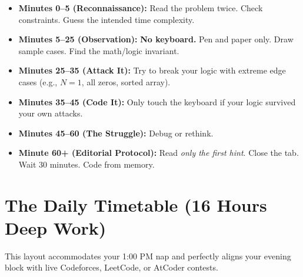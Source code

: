 \documentclass[12pt, a4paper]{article}
\begin{document}
\begin{sidebar}
\begin{itemize}[leftmargin=1.5em, itemsep=6pt]

  \item \textbf{Minutes 0--5 (Reconnaissance):} Read the problem twice. Check
        constraints. Guess the intended time complexity.

  \item \textbf{Minutes 5--25 (Observation):} \textbf{No keyboard.} Pen and
        paper only. Draw sample cases. Find the math/logic invariant.

  \item \textbf{Minutes 25--35 (Attack It):} Try to break your logic with
        extreme edge cases (e.g., $N = 1$, all zeros, sorted array).

  \item \textbf{Minutes 35--45 (Code It):} Only touch the keyboard if your
        logic survived your own attacks.

  \item \textbf{Minutes 45--60 (The Struggle):} Debug or rethink.

  \item \textbf{Minute 60+ (Editorial Protocol):} Read \emph{only the first
        hint}. Close the tab. Wait 30 minutes. Code from memory.

\end{itemize}
\end{sidebar}

\section{The Daily Timetable (16 Hours Deep Work)}

This layout accommodates your 1:00 PM nap and perfectly aligns your evening
block with live Codeforces, LeetCode, or AtCoder contests.
\end{document}
